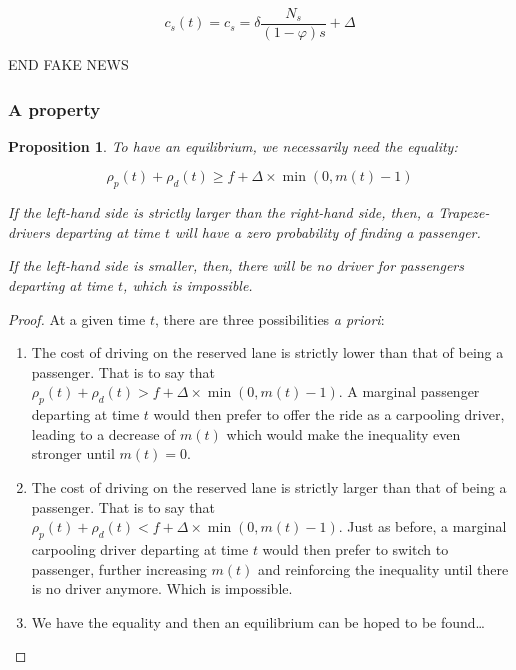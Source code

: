 \documentclass[english, a4paper]{article}
\theoremstyle{plain}
\newtheorem{prop}{Proposition}
\begin{document}
\begin{equation}
    c_s(t) = c_s = \delta \frac{N_s}{(1-\varphi)s} + \Delta
\end{equation}

END FAKE NEWS

\subsubsection{A property}

\begin{prop}
    To have an equilibrium, we necessarily need the equality:

    \begin{equation}
        \rho_p(t) + \rho_d(t) \geq f + \Delta \times \min (0, m(t)-1)
    \end{equation}

    If the left-hand side is strictly larger than the right-hand side, then, a Trapeze-drivers departing at time $t$ will have a zero probability of finding a passenger.

    If the left-hand side is smaller, then, there will be no driver for passengers departing at time $t$, which is impossible.
\end{prop}

\begin{proof}
    At a given time $t$, there are three possibilities \emph{a priori}:
    \begin{enumerate}
        \item The cost of driving on the reserved lane is strictly lower than that of being a passenger. That is to say that $\rho_p(t) + \rho_d(t) > f + \Delta \times \min (0, m(t)-1)$. A marginal passenger departing at time $t$ would then prefer to offer the ride as a carpooling driver, leading to a decrease of $m(t)$ which would make the inequality even stronger until $m(t) = 0$.
        \item The cost of driving on the reserved lane is strictly larger than that of being a passenger. That is to say that $\rho_p(t) + \rho_d(t) < f + \Delta \times \min (0, m(t)-1)$. Just as before, a marginal carpooling driver departing at time $t$ would then prefer to switch to passenger, further increasing $m(t)$ and reinforcing the inequality until there is no driver anymore. Which is impossible.
        \item We have the equality and then an equilibrium can be hoped to be found…
    \end{enumerate}
\end{proof}
\end{document}
